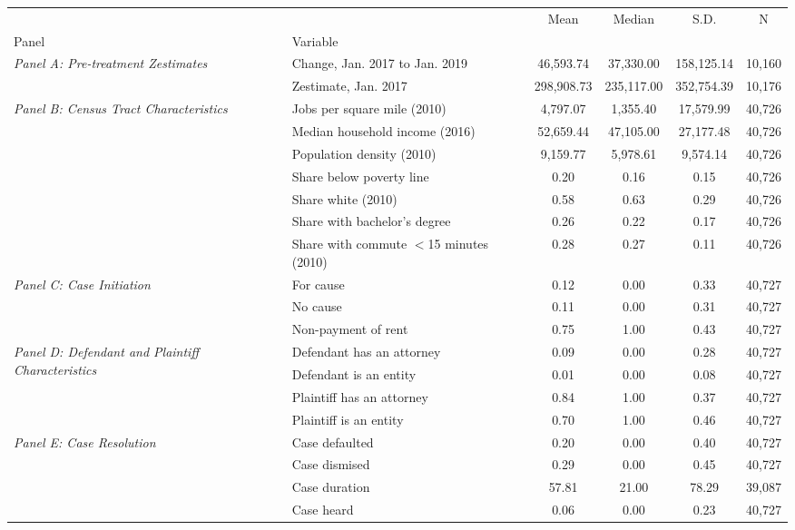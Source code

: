\begin{tabular}{llcccc}
\toprule
 &  & Mean & Median & S.D. & N \\
Panel & Variable &  &  &  &  \\
\midrule
\multirow[c]{2}{4cm}{\textit{Panel A: Pre-treatment Zestimates}} & Change, Jan. 2017 to Jan. 2019 & 46,593.74 & 37,330.00 & 158,125.14 & 10,160 \\
 & Zestimate, Jan. 2017 & 298,908.73 & 235,117.00 & 352,754.39 & 10,176 \\
\cline{1-6}
\multirow[c]{7}{4cm}{\textit{Panel B: Census Tract Characteristics}} & Jobs per square mile (2010) & 4,797.07 & 1,355.40 & 17,579.99 & 40,726 \\
 & Median household income (2016) & 52,659.44 & 47,105.00 & 27,177.48 & 40,726 \\
 & Population density (2010) & 9,159.77 & 5,978.61 & 9,574.14 & 40,726 \\
 & Share below poverty line & 0.20 & 0.16 & 0.15 & 40,726 \\
 & Share white (2010) & 0.58 & 0.63 & 0.29 & 40,726 \\
 & Share with bachelor's degree & 0.26 & 0.22 & 0.17 & 40,726 \\
 & Share with commute $<$15 minutes (2010) & 0.28 & 0.27 & 0.11 & 40,726 \\
\cline{1-6}
\multirow[c]{3}{4cm}{\textit{Panel C: Case Initiation}} & For cause & 0.12 & 0.00 & 0.33 & 40,727 \\
 & No cause & 0.11 & 0.00 & 0.31 & 40,727 \\
 & Non-payment of rent & 0.75 & 1.00 & 0.43 & 40,727 \\
\cline{1-6}
\multirow[c]{4}{4cm}{\textit{Panel D: Defendant and Plaintiff Characteristics}} & Defendant has an attorney & 0.09 & 0.00 & 0.28 & 40,727 \\
 & Defendant is an entity & 0.01 & 0.00 & 0.08 & 40,727 \\
 & Plaintiff has an attorney & 0.84 & 1.00 & 0.37 & 40,727 \\
 & Plaintiff is an entity & 0.70 & 1.00 & 0.46 & 40,727 \\
\cline{1-6}
\multirow[c]{6}{4cm}{\textit{Panel E: Case Resolution}} & Case defaulted & 0.20 & 0.00 & 0.40 & 40,727 \\
 & Case dismised & 0.29 & 0.00 & 0.45 & 40,727 \\
 & Case duration & 57.81 & 21.00 & 78.29 & 39,087 \\
 & Case heard & 0.06 & 0.00 & 0.23 & 40,727 \\

\end{tabular}
